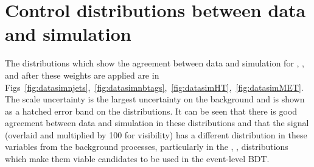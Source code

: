 









\section{Control distributions between data and simulation}


The distributions which show the agreement between data and simulation for \njets, \nbtags, \HT and \MET after these weights are applied are in Figs~\ref{fig:datasimnjets},~\ref{fig:datasimnbtags},~\ref{fig:datasimHT},~\ref{fig:datasimMET}. The scale uncertainty is the largest uncertainty on the background and is shown as a hatched error band on the distributions. It can be seen that there is good agreement between data and simulation in these distributions and that the signal (overlaid and multiplied by 100 for visibility) has a different distribution in these variables from the background processes, particularly in the \njets, \nbtags, \HT distributions which make them viable candidates to be used in the event-level BDT.

